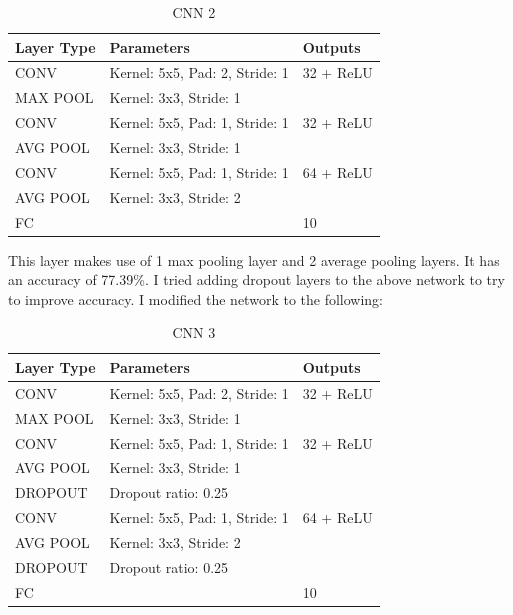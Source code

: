 \documentclass[10pt,twocolumn,letterpaper]{article}
\begin{document}
\begin{table}[h]
\begin{tabular}{|l|l|l|}
\hline
Layer Type & Parameters                     & Outputs \\ \hline
CONV       & Kernel: 5x5, Pad: 2, Stride: 1 & 32 + ReLU     \\ \hline
MAX POOL   & Kernel: 3x3, Stride: 1         &         \\ \hline
CONV       & Kernel: 5x5, Pad: 1, Stride: 1 & 32 + ReLU      \\ \hline
AVG POOL   & Kernel: 3x3, Stride: 1         &         \\ \hline
CONV       & Kernel: 5x5, Pad: 1, Stride: 1 & 64 + ReLU     \\ \hline
AVG POOL   & Kernel: 3x3, Stride: 2         &         \\ \hline
FC         &                                & 10      \\ \hline
\end{tabular}
\label{net2}
\caption{CNN 2}
\end{table}

This layer makes use of 1 max pooling layer and 2 average pooling layers. It has an accuracy of 77.39\%. I tried adding dropout layers to the above network to try to improve accuracy. I modified the network to the following:

\begin{table}[h]
\begin{tabular}{|l|l|l|}
\hline
Layer Type & Parameters                     & Outputs \\ \hline
CONV       & Kernel: 5x5, Pad: 2, Stride: 1 & 32 + ReLU     \\ \hline
MAX POOL   & Kernel: 3x3, Stride: 1         &         \\ \hline
CONV       & Kernel: 5x5, Pad: 1, Stride: 1 & 32 + ReLU      \\ \hline
AVG POOL   & Kernel: 3x3, Stride: 1         &         \\ \hline
DROPOUT   & Dropout ratio: 0.25         &         \\ \hline
CONV       & Kernel: 5x5, Pad: 1, Stride: 1 & 64 + ReLU     \\ \hline
AVG POOL   & Kernel: 3x3, Stride: 2         &         \\ \hline
DROPOUT   & Dropout ratio: 0.25         &         \\ \hline
FC         &                                & 10      \\ \hline
\end{tabular}
\label{net3}
\caption{CNN 3}
\end{table}
\end{document}
